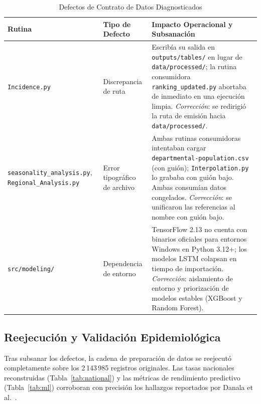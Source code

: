\documentclass[conference]{IEEEtran}
\begin{document}
\begin{table}[!t]
\caption{Defectos de Contrato de Datos Diagnosticados}
\label{tab:defects}
\centering
\footnotesize
\begin{tabularx}{\columnwidth}{@{}p{2.3cm}p{1.4cm}X@{}}
\toprule
\textbf{Rutina} & \textbf{Tipo de Defecto} & \textbf{Impacto Operacional y Subsanaci\'on} \\
\midrule
\texttt{Incidence.py} & Discrepancia de ruta & 
Escrib\'ia su salida en \texttt{outputs/tables/} en lugar de \texttt{data/processed/}; la rutina consumidora \texttt{ranking\_updated.py} abortaba de inmediato en una ejecuci\'on limpia.\newline
\textit{Correcci\'on}: se redirigi\'o la ruta de emisi\'on hacia \texttt{data/processed/}. \\
\addlinespace
\texttt{seasonality\_}\allowbreak\texttt{analysis.py},\newline
\texttt{Regional\_}\allowbreak\texttt{Analysis.py} & Error tipogr\'afico de archivo & 
Ambas rutinas consumidoras intentaban cargar \texttt{departmental-population.csv} (con gui\'on); \texttt{Interpolation.py} lo grababa con gui\'on bajo. Ambas consum\'ian datos congelados.\newline
\textit{Correcci\'on}: se unificaron las referencias al nombre con gui\'on bajo. \\
\addlinespace
\texttt{src/modeling/} & Dependencia de entorno & 
TensorFlow 2.13 no cuenta con binarios oficiales para entornos Windows en Python 3.12+; los modelos LSTM colapsan en tiempo de importaci\'on.\newline
\textit{Correcci\'on}: aislamiento de entorno y priorizaci\'on de modelos estables (XGBoost y Random Forest). \\
\bottomrule
\end{tabularx}
\end{table}

\subsection{Reejecuci\'on y Validaci\'on Epidemiol\'ogica}

Tras subsanar los defectos, la cadena de preparaci\'on de datos se reejecut\'o completamente sobre los 2\,143\,985 registros originales. Las tasas nacionales reconstruidas (Tabla~\ref{tab:national}) y las m\'etricas de rendimiento predictivo (Tabla~\ref{tab:ml}) corroboran con precisi\'on los hallazgos reportados por Danala et al.~\cite{Danala2024}.
\end{document}
